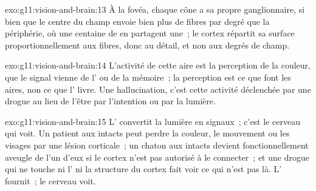 \begin{solution}{exo:g11:vision-and-brain:13}
À la fovéa, chaque cône a sa propre  ganglionnaire, si bien que
le centre du champ envoie bien plus de fibres par degré que la
périphérie, où une centaine de  en partagent une~; le cortex
répartit sa surface proportionnellement aux fibres, donc au détail, et
non aux degrés de champ.
\end{solution}

\begin{solution}{exo:g11:vision-and-brain:14}
L'activité de cette aire est la perception de la couleur, que le signal
vienne de l' ou de la mémoire~; la perception est ce que font les
aires, non ce que l' livre. Une hallucination, c'est cette activité
déclenchée par une drogue au lieu de l'être par l'intention ou par la
lumière.
\end{solution}

\begin{solution}{exo:g11:vision-and-brain:15}
L' convertit la lumière en signaux~; c'est le cerveau qui voit. Un
patient aux  intacts peut perdre la couleur, le mouvement ou les
visages par une lésion corticale~; un chaton aux  intacts devient
fonctionnellement aveugle de l'un d'eux si le cortex n'est pas autorisé
à le connecter~; et une drogue qui ne touche ni l' ni la structure
du cortex fait voir ce qui n'est pas là. L' fournit~; le cerveau
voit.
\end{solution}

